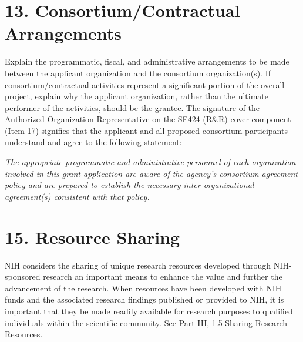 \documentclass[11pt, notitlepage]{article} %
\begin{document}
\newpage

\section*{13. Consortium/Contractual Arrangements}

Explain the programmatic, fiscal, and administrative arrangements to be made between the applicant organization and the consortium organization(s). If consortium/contractual activities represent a significant portion of the overall project, explain why the applicant organization, rather than the ultimate performer of the activities, should be the grantee. The signature of the Authorized Organization Representative on the SF424 (R\&R) cover component (Item 17) signifies that the applicant and all proposed consortium participants understand and agree to the following statement:

\emph{The appropriate programmatic and administrative personnel of each organization involved in this grant application are aware of the agency's consortium agreement policy and are prepared to establish the necessary inter-organizational agreement(s) consistent with that policy.}


\newpage

\section*{15. Resource Sharing}

NIH considers the sharing of unique research resources developed through NIH-sponsored research an important means to enhance the value and further the advancement of the research. When resources have been developed with NIH funds and the associated research findings published or provided to NIH, it is important that they be made readily available for research purposes to qualified individuals within the scientific community. See Part III, 1.5 Sharing Research Resources.
\end{document}
